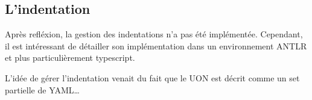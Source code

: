 \documentclass[
    iict, %
    il, %
]{heig-tb}
\begin{document}





\subsection{L'indentation}

Après refléxion, la gestion des indentations n'a pas été implémentée. Cependant, il est intéressant de détailler son implémentation dans un environnement ANTLR
et plus particulièrement typescript.

L'idée de gérer l'indentation venait du fait que le UON est décrit comme un set partielle de YAML\dots
\end{document}
